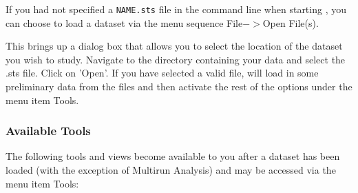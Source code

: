 \documentclass[10pt]{article}
\begin{document}
If you had not specified a {\tt NAME.sts} file in the command line
when starting \projections{}, you can choose to load a dataset via
the menu sequence File$->$Open File(s).

This brings up a dialog box that allows you to select the location of
the dataset you wish to study. Navigate to the directory containing
your data and select the .sts file.  Click on 'Open'.  If you have
selected a valid file, \projections{} will load in some preliminary
data from the files and then activate the rest of the options under
the menu item Tools.

\subsubsection{Available Tools}

The following tools and views become available to you after a dataset
has been loaded (with the exception of Multirun Analysis) and may be
accessed via the menu item Tools:
\end{document}

